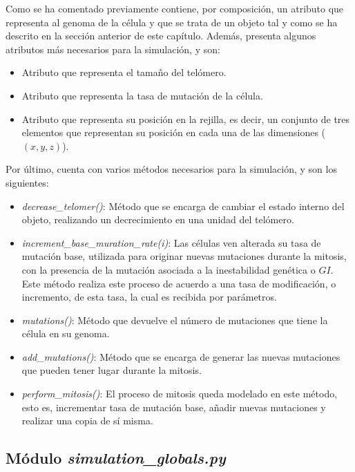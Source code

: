 Como se ha comentado previamente contiene, por composición, un atributo que representa
al genoma de la célula y que se trata de un objeto tal y como se ha descrito en la sección anterior de este capítulo.
Además, presenta algunos atributos más necesarios para la simulación, y son:

\begin{itemize}
    \item Atributo que representa el tamaño del telómero.
    \item Atributo que representa la tasa de mutación de la célula.
    \item Atributo que representa su posición en la rejilla, es decir, un conjunto de tres elementos
    que representan su posición en cada una de las dimensiones ($(x,y,z)$).
\end{itemize}

Por último, cuenta con varios métodos necesarios para la simulación, y son los siguientes:

\begin{itemize}
    \item \textit{decrease\_telomer()}: Método que se encarga de cambiar el estado interno del objeto, realizando un decrecimiento en una unidad del telómero.
    \item \textit{increment\_base\_muration\_rate(i)}: Las células ven alterada su tasa de mutación base, utilizada para originar nuevas mutaciones durante la mitosis,
    con la presencia de la mutación asociada a la inestabilidad genética o $GI$. Este método realiza este proceso de acuerdo a una tasa de modificación, o incremento,
    de esta tasa, la cual es recibida por parámetros.
    \item \textit{mutations()}: Método que devuelve el número de mutaciones que tiene la célula en su genoma.
    \item \textit{add\_mutations()}: Método que se encarga de generar las nuevas mutaciones que pueden tener lugar durante la mitosis.
    \item \textit{perform\_mitosis()}: El proceso de mitosis queda modelado en este método, esto es, incrementar tasa de mutación base, añadir nuevas mutaciones y
    realizar una copia de sí misma.
\end{itemize}

\subsection{Módulo \textit{simulation\_globals.py}}

